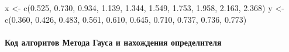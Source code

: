 \documentclass[
  letterpaper,
  DIV=11,
  numbers=noendperiod]{scrartcl}
\let\oldparagraph\paragraph
\renewcommand{\paragraph}[1]{\oldparagraph{#1}\mbox{}}
\newenvironment{Shaded}{\begin{snugshade}}{\end{snugshade}}
\newcommand{\FloatTok}[1]{\textcolor[rgb]{0.68,0.00,0.00}{#1}}
\newcommand{\FunctionTok}[1]{\textcolor[rgb]{0.28,0.35,0.67}{#1}}
\newcommand{\NormalTok}[1]{\textcolor[rgb]{0.00,0.23,0.31}{#1}}
\newcommand{\OtherTok}[1]{\textcolor[rgb]{0.00,0.23,0.31}{#1}}
\begin{document}
\begin{Shaded}
\begin{Highlighting}[]
\NormalTok{x }\OtherTok{\textless{}{-}} \FunctionTok{c}\NormalTok{(}\FloatTok{0.525}\NormalTok{, }\FloatTok{0.730}\NormalTok{, }\FloatTok{0.934}\NormalTok{, }\FloatTok{1.139}\NormalTok{, }\FloatTok{1.344}\NormalTok{, }\FloatTok{1.549}\NormalTok{, }\FloatTok{1.753}\NormalTok{, }\FloatTok{1.958}\NormalTok{, }\FloatTok{2.163}\NormalTok{, }\FloatTok{2.368}\NormalTok{)}
\NormalTok{y }\OtherTok{\textless{}{-}} \FunctionTok{c}\NormalTok{(}\FloatTok{0.360}\NormalTok{, }\FloatTok{0.426}\NormalTok{, }\FloatTok{0.483}\NormalTok{, }\FloatTok{0.561}\NormalTok{, }\FloatTok{0.610}\NormalTok{, }\FloatTok{0.645}\NormalTok{, }\FloatTok{0.710}\NormalTok{, }\FloatTok{0.737}\NormalTok{, }\FloatTok{0.736}\NormalTok{, }\FloatTok{0.773}\NormalTok{)}
\end{Highlighting}
\end{Shaded}

\paragraph{Код алгоритов Метода Гауса и нахождения
определителя}\label{ux43aux43eux434-ux430ux43bux433ux43eux440ux438ux442ux43eux432-ux43cux435ux442ux43eux434ux430-ux433ux430ux443ux441ux430-ux438-ux43dux430ux445ux43eux436ux434ux435ux43dux438ux44f-ux43eux43fux440ux435ux434ux435ux43bux438ux442ux435ux43bux44f}
\end{document}
